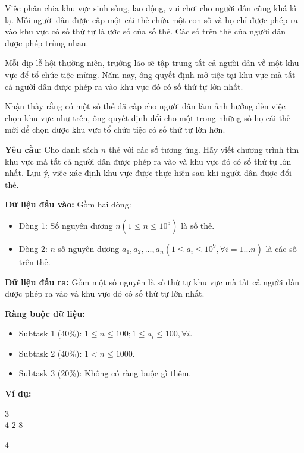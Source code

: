 \documentclass[12pt]{scrartcl}  %
\begin{document}
Việc phân chia khu vực sinh sống, lao động, vui chơi cho người dân cũng khá kì lạ. Mỗi người dân được cấp một cái thẻ chứa một con số và họ chỉ được phép ra vào khu vực có số thứ tự là ước số của số thẻ. Các số trên thẻ của người dân được phép trùng nhau.

Mỗi dịp lễ hội thường niên, trưởng lão sẽ tập trung tất cả người dân về một khu vực để tổ chức tiệc mừng. Năm nay, ông quyết định mở tiệc tại khu vực mà tất cả người dân được phép ra vào khu vực đó có số thứ tự lớn nhất. 

Nhận thấy rằng có một số thẻ đã cấp cho người dân làm ảnh hưởng đến việc chọn khu vực như trên, ông quyết định đổi cho một trong những số họ cái thẻ mới để chọn được khu vực tổ chức tiệc có số thứ tự lớn hơn.

\textbf{Yêu cầu:} Cho danh sách $n$ thẻ với các số tương ứng. Hãy viết chương trình tìm khu vực mà tất cả người dân được phép ra vào và khu vực đó có số thứ tự lớn nhất. Lưu ý, việc xác định khu vực được thực hiện sau khi người dân được đổi thẻ. 

\textbf{Dữ liệu đầu vào:}
Gồm hai dòng:
\begin{itemize}
    \item Dòng 1: Số nguyên dương $n (1 \leq n \leq 10^5)$ là số thẻ.
    \item Dòng 2: $n$ số nguyên dương $a_1, a_2, ..., a_n (1 \leq a_i \leq 10^9, \forall i = 1 ... n)$ là các số trên thẻ.
\end{itemize}

\textbf{Dữ liệu đầu ra:}
Gồm một số nguyên là số thứ tự khu vực mà tất cả người dân được phép ra vào và khu vực đó có số thứ tự lớn nhất.

\textbf{Ràng buộc dữ liệu:}
\begin{itemize}
    \item Subtask 1 (40\%): $1 \leq n \leq 100; 1 \leq a_i \leq 100, \forall i$.
    \item Subtask 2 (40\%): $1 < n \leq 1000$.
    \item Subtask 3 (20\%): Không có ràng buộc gì thêm.
\end{itemize}

\textbf{Ví dụ:}
\begin{tcolorbox}[colback=gray!5!white, colframe=blue!50!black, title=Input]
3\\
4 2 8
\end{tcolorbox}

\begin{tcolorbox}[colback=gray!5!white, colframe=green!50!black, title=Output]
4
\end{tcolorbox}
\end{document}
